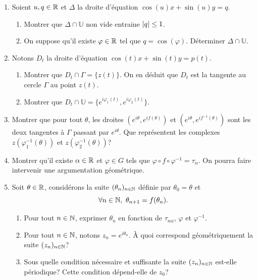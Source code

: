 \begin{enumerate}
\item Soient $u, q\in \mathbb{R}$ et $\Delta$ la droite d'équation $\cos(u)x + \sin(u)y = q$.
\begin{enumerate}
 \item Montrer que $\Delta \cap \mathbb{U}$ non vide entraine $\left\vert q\right\vert\leq 1$.
 \item On suppose qu'il existe $\varphi \in \mathbb{R}$ tel que $q = \cos(\varphi)$. Déterminer $\Delta \cap \mathbb{U}$.
\end{enumerate}

\item Notons $D_{t}$ la droite d'équation $\cos(t)x + \sin(t)y = p(t)$. 
\begin{enumerate}
  \item Montrer que $D_{t}\cap \Gamma = \{ z(t)\}$. \newline
On en déduit que $D_t$ est la tangente au cercle $\Gamma$ au point $z(t)$. 

  \item Montrer que $D_{t}\cap \mathbb{U} = \{ e^{i\varphi_{1}(t)}, e^{i\varphi_{2}(t)} \}$. 
\end{enumerate}

\item  Montrer que pour tout $\theta$, les droites $(e^{i\theta}, e^{if(\theta)})$ et $(e^{i\theta}, e^{if^{-1}(\theta)})$ sont les deux tangentes 
à $\Gamma$ passant par $e^{i\theta}$. Que représentent les complexes $z(\varphi_1^{-1}(\theta))$ et $z(\varphi_2^{-1}(\theta))$?
         
\item Montrer qu'il existe $\alpha \in \mathbb{R}$ et $\varphi \in G$ tels que $\varphi \circ f \circ \varphi^{-1} = \tau_{\alpha}$. On pourra faire intervenir une argumentation géométrique.


\item Soit $\theta \in \mathbb{R}$, considérons la suite $(\theta_{n})_{n\in \mathbb{N}}$ définie par $\theta_{0} = \theta$ et  
\[ 
\forall n\in \mathbb{N},\ \theta_{n+1} = f(\theta_{n}).
\]
  \begin{enumerate}
   \item Pour tout $n\in \mathbb{N}$, exprimer $\theta_{n}$ en fonction de $\tau_{n\alpha}$, $\varphi$ et $\varphi^{-1}$.
   \item Pour tout $n\in \mathbb{N}$, notons $z_{n} = e^{i\theta_{n}}$. \`A quoi correspond géométriquement la suite $(z_{n})_{n\in \mathbb{N}}$?
   \item Sous quelle condition nécessaire et suffisante la suite $(z_{n})_{n\in \mathbb{N}}$ est-elle périodique? Cette condition dépend-elle de $z_{0}$?
  \end{enumerate}


\end{enumerate}
